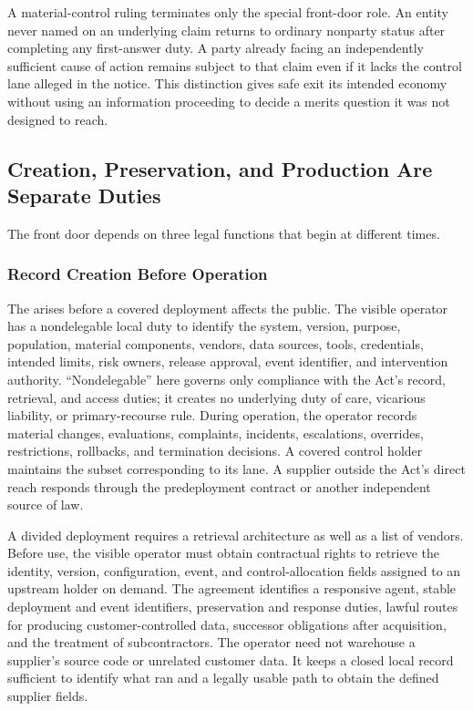 A material-control ruling terminates only the special front-door role. An entity never named on an underlying claim returns to ordinary nonparty status after completing any first-answer duty. A party already facing an independently sufficient cause of action remains subject to that claim even if it lacks the control lane alleged in the notice. This distinction gives safe exit its intended economy without using an information proceeding to decide a merits question it was not designed to reach.

\subsection{Creation, Preservation, and Production Are Separate Duties}
\label{sec:three-duties}

The front door depends on three legal functions that begin at different times.

\subsubsection{Record Creation Before Operation}

The  arises before a covered deployment affects the public. The visible operator has a nondelegable local duty to identify the system, version, purpose, population, material components, vendors, data sources, tools, credentials, intended limits, risk owners, release approval, event identifier, and intervention authority. ``Nondelegable'' here governs only compliance with the Act's record, retrieval, and access duties; it creates no underlying duty of care, vicarious liability, or primary-recourse rule. During operation, the operator records material changes, evaluations, complaints, incidents, escalations, overrides, restrictions, rollbacks, and termination decisions. A covered control holder maintains the subset corresponding to its lane. A supplier outside the Act's direct reach responds through the predeployment contract or another independent source of law.

A divided deployment requires a retrieval architecture as well as a list of vendors. Before use, the visible operator must obtain contractual rights to retrieve the identity, version, configuration, event, and control-allocation fields assigned to an upstream holder on demand. The agreement identifies a responsive agent, stable deployment and event identifiers, preservation and response duties, lawful routes for producing customer-controlled data, successor obligations after acquisition, and the treatment of subcontractors. The operator need not warehouse a supplier's source code or unrelated customer data. It keeps a closed local record sufficient to identify what ran and a legally usable path to obtain the defined supplier fields.

